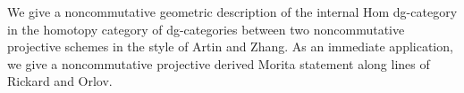 We give a noncommutative geometric description of the internal Hom dg-category in the homotopy category of dg-categories between two noncommutative projective schemes in the style of Artin and Zhang.
As an immediate application, we give a noncommutative projective derived Morita statement along lines of Rickard and Orlov. 
